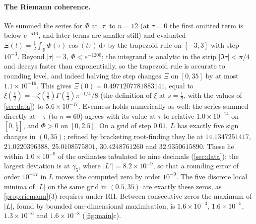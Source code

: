 \documentclass[11pt]{article}
\theoremstyle{definition}\newtheorem{definition}[theorem]{Definition}
\theoremstyle{remark}\newtheorem{remark}[theorem]{Remark}
\newcommand{\R}{\mathbb R}\newcommand{\C}{\mathbb C}\newcommand{\N}{\mathbb N}
\newcommand{\dd}{\,\mathrm d}\newcommand{\e}{\mathrm e}
\begin{document}
\paragraph{The Riemann coherence.} We summed the series for $\Phi$ at $|\tau|$ to $n=12$ (at $\tau=0$ the first omitted term is below $e^{-516}$, and later terms are smaller still) and evaluated $\Xi(t)=\frac12\int_\R\Phi(\tau)\cos(t\tau)\dd\tau$ by the trapezoid rule on $[-3,3]$ with step $10^{-3}$. Beyond $|\tau|=3$, $\Phi<e^{-1200}$; the integrand is analytic in the strip $|\Im\tau|<\pi/4$ and decays faster than exponentially, so the trapezoid rule is accurate to rounding level, and indeed halving the step changes $\Xi$ on $[0,35]$ by at most $1.1\times10^{-16}$. This gives $\Xi(0)=0.4971207781883141$, equal to $\xi(\frac12)=-\zeta(\frac12)\Gamma(\frac14)\pi^{-1/4}/8$ (the definition of $\xi$ at $s=\frac12$, with the values of \cref{sec:data}) to $5.6\times10^{-17}$. Evenness holds numerically as well: the series summed directly at $-\tau$ (to $n=60$) agrees with its value at $\tau$ to relative $1.0\times10^{-14}$ on $[0,\frac12]$, and $\Phi>0$ on $[0,2.5]$. On a grid of step $0.01$, $L$ has exactly five sign changes in $(0,35)$; refined by bracketing root-finding they lie at $14.1347251417$, $21.0220396388$, $25.0108575801$, $30.4248761260$ and $32.9350615890$. These lie within $1.0\times10^{-9}$ of the ordinates tabulated to nine decimals \cite{Odlyzko} (\cref{sec:data}); the largest deviation is at $\gamma_5$, where $|L'|=8.2\times10^{-9}$, so that a rounding error of order $10^{-17}$ in $L$ moves the computed zero by order $10^{-9}$. The five discrete local minima of $|L|$ on the same grid in $(0.5,35)$ are exactly these zeros, as \cref{prop:riemann}(3) requires under RH. Between consecutive zeros the maximum of $|L|$, found by bounded one-dimensional maximisation, is $1.6\times10^{-3}$, $1.6\times10^{-5}$, $1.3\times10^{-6}$ and $1.6\times10^{-8}$ (\cref{fig:main}c).
\end{document}
